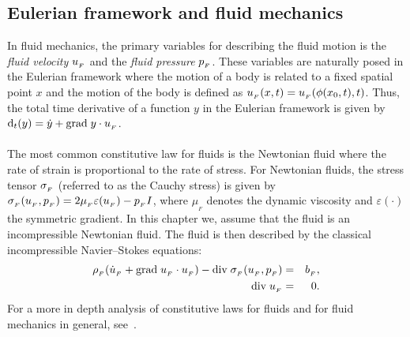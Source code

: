 \subsection{Eulerian framework and fluid mechanics}
\label{selim:sec:fluid}
In fluid mechanics, the primary variables for describing the fluid
motion is the \emph{fluid velocity} $u_{_{F}}$ and the \emph{fluid
  pressure} $p_{_{F}}$. These variables are naturally posed in the Eulerian
framework where the motion of a body is related to a fixed spatial
point $x$ and the motion of the body is defined as $u_{_{F}}(x,t) =
u_{_{F}}(\phi(x_0,t),t)$. Thus, the total time derivative of a function $y$
in the Eulerian framework is given by $\textrm{d}_t(y) = \dot{y} +
\textrm{grad}\;y\cdot u_{_{F}}$.
\\\\
The most common constitutive law for fluids is the Newtonian fluid
where the rate of strain is proportional to the rate of stress. For
Newtonian fluids, the stress tensor $\sigma_{_{F}}$ (referred to as the
Cauchy stress) is given by $\sigma_{_{F}}(u_{_{F}}, p_{_{F}}) = 2\mu_{_{F}}\varepsilon (u_{_{F}}) -
p_{_{F}} I$, where $\mu_{_{F}}$ denotes the dynamic viscosity and
$\varepsilon(\cdot)$ the symmetric gradient. In this chapter we,
assume that the fluid is an incompressible Newtonian fluid. The fluid
is then described by the classical incompressible Navier--Stokes
equations:
\begin{eqnarray}
  \label{selim:eq:NSmom}
      \rho_{_{F}}(\dot{u}_{_{F}} + \textrm{grad}\;u_{_{F}}\cdot u_{_{F}})- \textrm{div}\;
      \sigma_{_{F}}(u_{_{F}}, p_{_{F}}) &=& b_{_{F}},\\
  \label{selim:eq:NScon}
      \textrm{div}\; u_{_{F}} &=& 0.
\end{eqnarray}
For a more in depth analysis of constitutive laws for fluids and for
fluid mechanics in general, see~\cite{Batchelor1967,Panton1984,
  WeltyWicksWilson2001}.

